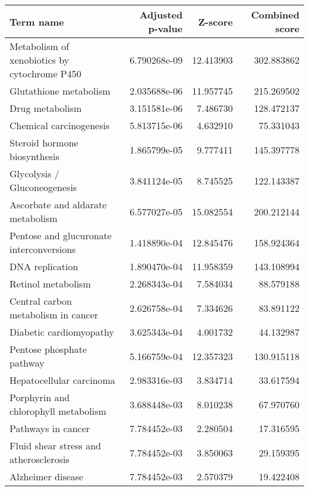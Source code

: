 \begin{tabular}{lrrr}
\toprule
                                   Term name &  Adjusted p-value &   Z-score &  Combined score \\
\midrule
Metabolism of xenobiotics by cytochrome P450 &      6.790268e-09 & 12.413903 &      302.883862 \\
                      Glutathione metabolism &      2.035688e-06 & 11.957745 &      215.269502 \\
                             Drug metabolism &      3.151581e-06 &  7.486730 &      128.472137 \\
                     Chemical carcinogenesis &      5.813715e-06 &  4.632910 &       75.331043 \\
                Steroid hormone biosynthesis &      1.865799e-05 &  9.777411 &      145.397778 \\
                Glycolysis / Gluconeogenesis &      3.841124e-05 &  8.745525 &      122.143387 \\
           Ascorbate and aldarate metabolism &      6.577027e-05 & 15.082554 &      200.212144 \\
    Pentose and glucuronate interconversions &      1.418890e-04 & 12.845476 &      158.924364 \\
                             DNA replication &      1.890470e-04 & 11.958359 &      143.108994 \\
                          Retinol metabolism &      2.268343e-04 &  7.584034 &       88.579188 \\
         Central carbon metabolism in cancer &      2.626758e-04 &  7.334626 &       83.891122 \\
                     Diabetic cardiomyopathy &      3.625343e-04 &  4.001732 &       44.132987 \\
                   Pentose phosphate pathway &      5.166759e-04 & 12.357323 &      130.915118 \\
                    Hepatocellular carcinoma &      2.983316e-03 &  3.834714 &       33.617594 \\
        Porphyrin and chlorophyll metabolism &      3.688448e-03 &  8.010238 &       67.970760 \\
                          Pathways in cancer &      7.784452e-03 &  2.280504 &       17.316595 \\
      Fluid shear stress and atherosclerosis &      7.784452e-03 &  3.850063 &       29.159395 \\
                           Alzheimer disease &      7.784452e-03 &  2.570379 &       19.422408 \\

\end{tabular}
